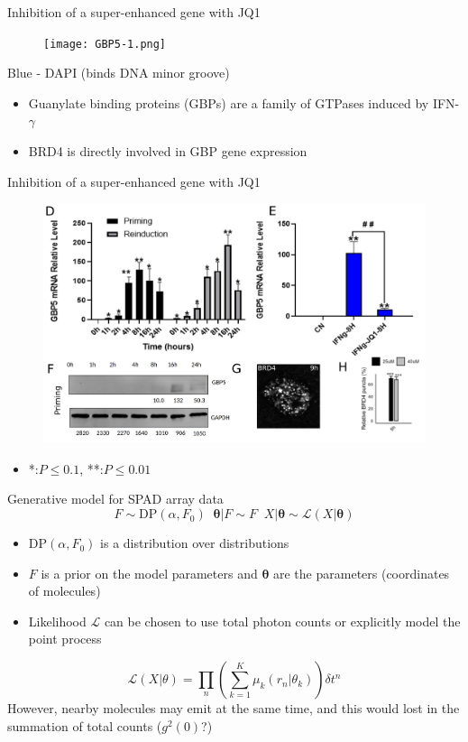 \documentclass{beamer}					%
\begin{document}
\begin{frame}{Inhibition of a super-enhanced gene with JQ1}
\begin{figure}
\texttt{[image: GBP5-1.png]}
\end{figure}
Blue - DAPI (binds DNA minor groove)
\begin{itemize}
\item Guanylate binding proteins (GBPs) are a family of GTPases induced by IFN-$\gamma$
\item BRD4 is directly involved in GBP gene expression
\end{itemize}
\end{frame}

\begin{frame}{Inhibition of a super-enhanced gene with JQ1}
\begin{figure}
\includegraphics[width=12cm]{GBP5-2.png}
\end{figure}
\begin{itemize}
\item *:$P \leq 0.1$, **:$P \leq 0.01$
\end{itemize}
\end{frame}

\begin{frame}{Generative model for SPAD array data}
\begin{equation*}
F \sim \mathrm{DP}(\alpha,F_{0})\;\;\bm{\theta}|F \sim F\;\;X|\bm{\theta} \sim \mathcal{L}(X|\bm{\theta}) 
\end{equation*}
\begin{itemize}
\item $\mathrm{DP}(\alpha,F_{0})$ is a distribution over distributions
\item $F$ is a prior on the model parameters and $\bm{\theta}$ are the parameters (coordinates of molecules)
\item Likelihood $\mathcal{L}$ can be chosen to use total photon counts or explicitly model the point process
\end{itemize}
\begin{equation*}
\mathcal{L}(X|\theta) = \prod_{n}\left(\sum_{k=1}^{K}\mu_{k}(r_{n}|\theta_{k})\right)\delta t^{n}
\end{equation*}
However, nearby molecules may emit at the same time, and this would lost in the summation of total counts ($g^{2}(0)$?)
\end{frame}
\end{document}
